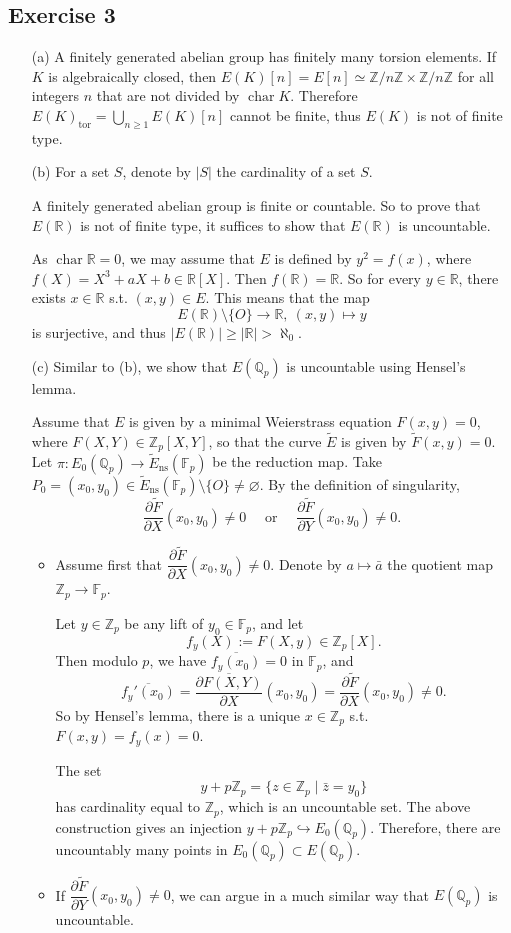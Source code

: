 \documentclass{article}
\theoremstyle{definition}
\theoremstyle{remark}
\newcommand{\R}{\mathbb{R}}
\newcommand{\Q}{\mathbb{Q}}
\newcommand{\Z}{\mathbb{Z}}
\newcommand{\F}{\mathbb{F}}
\DeclareMathOperator{\cha}{char} %
\newcommand{\pdfrac}[2]{\dfrac{\partial #1}{\partial #2}} %
\newcommand{\tor}{\mathrm{tor}}
\newcommand{\ns}{\mathrm{ns}}
\begin{document}
\subsection*{Exercise 3}
\begin{enumerate}
\item [(a)] A finitely generated abelian group has finitely many torsion elements.
If $K$ is algebraically closed,
then $E(K)[n] = E[n] \simeq \Z/n\Z\times \Z/n\Z$
for all integers $n$ that are not divided by $\cha K$.
Therefore $E(K)_\tor = \bigcup_{n\ge 1}E(K)[n]$ cannot be finite, thus $E(K)$ is not of finite type.
\item [(b)]
For a set $S$, denote by $|S|$ the cardinality of a set $S$.

A finitely generated abelian group is finite or countable. So to prove that $E(\R)$ is not of finite type, it suffices to show that $E(\R)$ is uncountable.

As $\cha \R = 0$, we may assume that $E$ is defined by $y^2 = f(x)$, where $f(X) = X^3 + aX +b\in \R[X]$.
Then $f(\R) = \R$. So for every $y\in\R$, there exists $x\in\R$ s.t. $(x, y)\in E$.
This means that the map \[E(\R)\setminus \{O\}\to \R,\ (x, y)\mapsto y\] is surjective, and thus $|E(\R)|\ge |\R| > \aleph_0$.

\item [(c)]
Similar to (b), we show that $E(\Q_p)$ is uncountable using Hensel's lemma.

Assume that $E$ is given by a minimal Weierstrass equation $F(x, y) = 0$,
where $F(X, Y)\in \Z_p[X, Y]$, so that the curve $\tilde{E}$ is given by $\tilde{F}(x, y) = 0$.
Let $\pi : E_0(\Q_p)\to\tilde{E}_\ns(\F_p)$ be the reduction map.
Take $P_0 = (x_0, y_0)\in \tilde{E}_\ns(\F_p)\setminus\{O\}\ne\varnothing$.
By the definition of singularity,
\[\pdfrac{\tilde{F}}{X}(x_0, y_0) \ne 0
\quad\text{   or   }\quad
\pdfrac{\tilde{F}}{Y}(x_0, y_0) \ne 0.\]
\begin{itemize}
\item Assume first that $\pdfrac{\tilde{F}}{X}(x_0, y_0) \ne 0$.
Denote by $a\mapsto\bar{a}$ the quotient map $\Z_p\to\F_p$.

Let $y\in\Z_p$ be any lift of $y_0\in\F_p$,
and let \[f_y(X) := F(X, y)\in \Z_p[X].\]
Then modulo $p$, we have $\overline{f_y(x_0)} = 0$ in $\F_p$,
and \[\overline{f_y'(x_0)} = \overline{\pdfrac{F(X, Y)}{X}}(x_0, y_0) = \pdfrac{\tilde{F}}{X}(x_0, y_0)\ne 0.\]
So by Hensel's lemma, there is a unique $x\in\Z_p$ s.t. $F(x, y) = f_y(x) = 0$.

The set \[y + p\Z_p = \{z\in\Z_p\mid \bar{z} = y_0\}\] has cardinality equal to $\Z_p$,
which is an uncountable set.
The above construction gives an injection $y + p\Z_p\hookrightarrow E_0(\Q_p)$.
Therefore, there are uncountably many points in $E_0(\Q_p)\subset E(\Q_p)$.

\item If $\pdfrac{\tilde{F}}{Y}(x_0, y_0) \ne 0$, we can argue in a much similar way that $E(\Q_p)$ is uncountable.
\end{itemize}

\end{enumerate}
\end{document}
